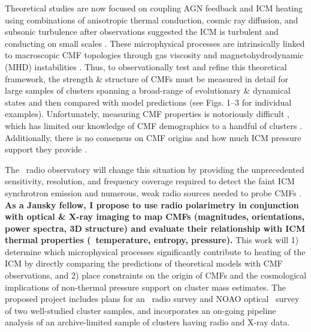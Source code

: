 \documentclass[letterpaper,12pt]{article}
\begin{document}
Theoretical studies are now focused on coupling AGN feedback and ICM
heating using combinations of anisotropic thermal conduction, cosmic
ray diffusion, and subsonic turbulence
\citep[\eg][]{2006MNRAS.373L..65H, conduction, 2008ApJ...688..859G,
  2009ApJ...699..348S, 2009ApJ...704..211B, 2010ApJ...712L.194P,
  2010ApJ...713.1332R, 2010arXiv1003.2719K, 2010arXiv1010.2277R} after
observations suggested the ICM is turbulent and conducting on small
scales \citep[\eg][]{2004MNRAS.347.1130V, haradent,
  2010MNRAS.407.2046M}. These microphysical processes are
intrinsically linked to macroscopic CMF topologies through gas
viscosity and magnetohydrodynamic (MHD) instabilities
\citep{2000ApJ...534..420B, 2008ApJ...673..758Q}. Thus, to
observationally test and refine this theoretical framework, the
strength \& structure of CMFs must be measured in detail for large
samples of clusters spanning a broad-range of evolutionary \&
dynamical states and then compared with model predictions (see
Figs. 1--3 for individual examples). Unfortunately, measuring CMF
properties is notoriously difficult
\citep[\eg][]{2001ApJ...547L.111C}, which has limited our knowledge of
CMF demographics to a handful of clusters
\citep[\eg][]{2010arXiv1007.5207G}. Additionally, there is no
consensus on CMF origins and how much ICM pressure support they
provide \citep{2001PhR...348..163G}.

The \evla\ radio observatory will change this situation by providing
the unprecedented sensitivity, resolution, and frequency coverage
required to detect the faint ICM synchrotron emission and numerous,
weak radio sources needed to probe CMFs
\citep{2008SSRv..134...93F}. {\bf{As a Jansky fellow, I propose to use
    radio polarimetry in conjunction with optical \& X-ray imaging to
    map CMFs (magnitudes, orientations, power spectra, 3D structure)
    and evaluate their relationship with ICM thermal properties
    (\eg\ temperature, entropy, pressure).}} This work will 1)
determine which microphysical processes significantly contribute to
heating of the ICM by directly comparing the predictions of
theoretical models with CMF observations, and 2) place constraints on
the origin of CMFs and the cosmological implications of non-thermal
pressure support on cluster mass estimates. The proposed project
includes plans for an \evla\ radio survey and NOAO optical
\halpha\ survey of two well-studied cluster samples, and incorporates
an on-going pipeline analysis of an archive-limited sample of clusters
having radio and X-ray data.\\
\end{document}
